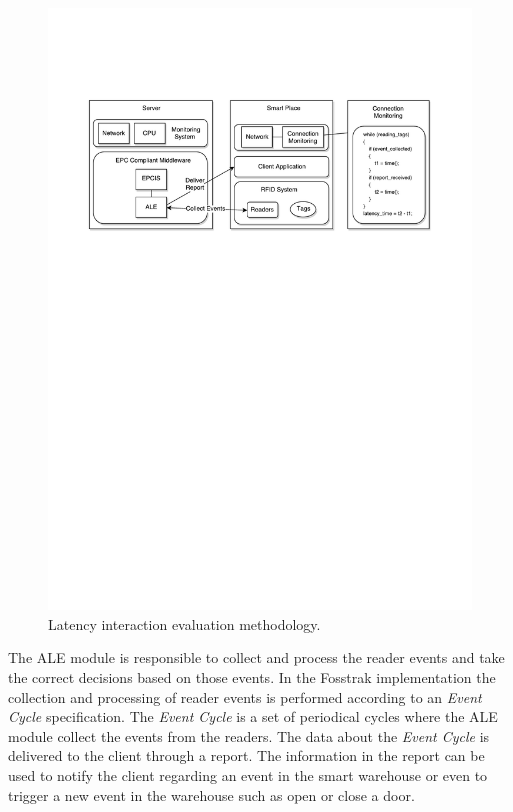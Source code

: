 \begin{figure}[ht!]
  \centering
  \includegraphics[width=.9\textwidth]{./images/eval_latency_methodology}
  \caption{Latency interaction evaluation methodology.}
  \label{fig:eval_latency_methodology}
\end{figure}

The \gls{ALE} module is responsible to collect and process the reader events and take the
correct decisions based on those events. In the Fosstrak implementation the collection and processing
of reader events is performed according to an \textit{Event Cycle} specification. The \textit{Event Cycle}
is a set of periodical cycles where the \gls{ALE} module collect the events from the readers. The data
about the \textit{Event Cycle} is delivered to the client through a report. The information in the report
can be used to notify the client regarding an event in the smart warehouse or even to trigger a new event
in the warehouse such as open or close a door.\\

